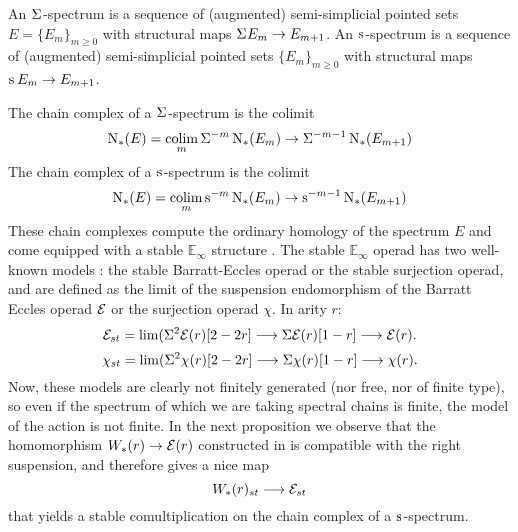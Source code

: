 An $\Sigma^{}$-spectrum is a sequence of (augmented) semi-simplicial pointed sets $E = \{E_m\}_{m\geq 0}$ with structural maps $\Sigma^{} E_m\to E_{m+1}$. An $\operatorname{s}^{}$-spectrum is a sequence of (augmented) semi-simplicial pointed sets $\{E_m\}_{m\geq 0}$ with structural maps $\operatorname{s}^{} E_m\to E_{m+1}$.

The chain complex of a $\Sigma^{}$-spectrum is the colimit
\[
    \operatorname{N}_{*}(E) = \operatorname*{colim}_m \Sigma^{-m} \operatorname{N}_{*}(E_m)\to \Sigma^{-m-1} \operatorname{N}_{*}(E_{m+1})
\]
The chain complex of a $\operatorname{s}^{}$-spectrum is the colimit
\[
    \operatorname{N}_{*}(E) = \operatorname*{colim}_m \operatorname{s}^{-m} \operatorname{N}_{*}(E_m)\to \operatorname{s}^{-m-1} \operatorname{N}_{*}(E_{m+1})
\]
These chain complexes compute the ordinary homology of the spectrum $E$ and come equipped with a stable $\mathbb{E}_\infty$ structure \cite{Gill2020}. The stable $\mathbb{E}_\infty$ operad has two well-known models \cite[Appendix]{berger2004combinatorial}: the stable Barratt-Eccles operad or the stable surjection operad, and are defined as the limit of the suspension endomorphism of the Barratt Eccles operad $\mathcal{E}$ or the surjection operad $\chi$. In arity $r$:
\[\mathcal{E}_{st} = \lim(  \Sigma^2\mathcal{E}(r)[2-2r] \longrightarrow \Sigma \mathcal{E}(r)[1-r]\longrightarrow \mathcal{E}(r).\]
\[\chi_{st} = \lim(  \Sigma^2\chi(r)[2-2r] \longrightarrow \Sigma \chi(r)[1-r]\longrightarrow \chi(r).\]
Now, these models are clearly not finitely generated (nor free, nor of finite type), so even if the spectrum of which we are taking spectral chains is finite, the model of the action is not finite. In the next proposition we observe that the homomorphism $W_*(r)\to \mathcal{E}(r)$ constructed in \cite{medina2021may_st} is compatible with the right suspension, and therefore gives a nice map
\[
    W_*(r)_{st}\longrightarrow \mathcal{E}_{st}
\]
that yields a stable comultiplication on the chain complex of a $\operatorname{s}^{}$-spectrum.

